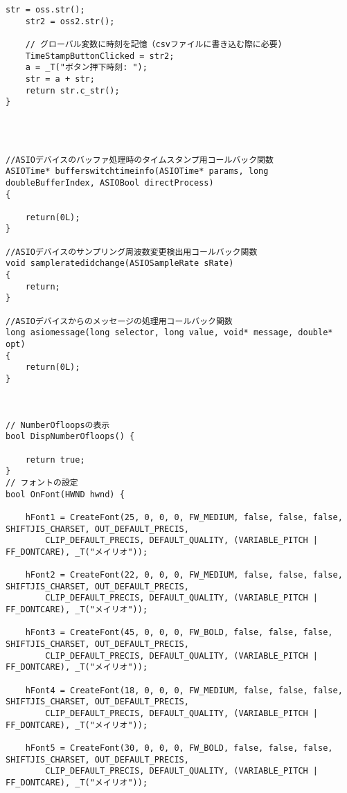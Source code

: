 \begin{lstlisting}[caption=main.cpp]
	str = oss.str();
	str2 = oss2.str();

	// グローバル変数に時刻を記憶（csvファイルに書き込む際に必要)
	TimeStampButtonClicked = str2;
	a = _T("ボタン押下時刻: ");
	str = a + str;
	return str.c_str();
}




//ASIOデバイスのバッファ処理時のタイムスタンプ用コールバック関数
ASIOTime* bufferswitchtimeinfo(ASIOTime* params, long doubleBufferIndex, ASIOBool directProcess)
{
	
	return(0L);
}

//ASIOデバイスのサンプリング周波数変更検出用コールバック関数
void sampleratedidchange(ASIOSampleRate sRate)
{
	return;
}

//ASIOデバイスからのメッセージの処理用コールバック関数
long asiomessage(long selector, long value, void* message, double* opt)
{
	return(0L);
}



// NumberOfloopsの表示
bool DispNumberOfloops() {

	return true;
}
// フォントの設定
bool OnFont(HWND hwnd) {

	hFont1 = CreateFont(25, 0, 0, 0, FW_MEDIUM, false, false, false, SHIFTJIS_CHARSET, OUT_DEFAULT_PRECIS,
		CLIP_DEFAULT_PRECIS, DEFAULT_QUALITY, (VARIABLE_PITCH | FF_DONTCARE), _T("メイリオ"));

	hFont2 = CreateFont(22, 0, 0, 0, FW_MEDIUM, false, false, false, SHIFTJIS_CHARSET, OUT_DEFAULT_PRECIS,
		CLIP_DEFAULT_PRECIS, DEFAULT_QUALITY, (VARIABLE_PITCH | FF_DONTCARE), _T("メイリオ"));

	hFont3 = CreateFont(45, 0, 0, 0, FW_BOLD, false, false, false, SHIFTJIS_CHARSET, OUT_DEFAULT_PRECIS,
		CLIP_DEFAULT_PRECIS, DEFAULT_QUALITY, (VARIABLE_PITCH | FF_DONTCARE), _T("メイリオ"));

	hFont4 = CreateFont(18, 0, 0, 0, FW_MEDIUM, false, false, false, SHIFTJIS_CHARSET, OUT_DEFAULT_PRECIS,
		CLIP_DEFAULT_PRECIS, DEFAULT_QUALITY, (VARIABLE_PITCH | FF_DONTCARE), _T("メイリオ"));

	hFont5 = CreateFont(30, 0, 0, 0, FW_BOLD, false, false, false, SHIFTJIS_CHARSET, OUT_DEFAULT_PRECIS,
		CLIP_DEFAULT_PRECIS, DEFAULT_QUALITY, (VARIABLE_PITCH | FF_DONTCARE), _T("メイリオ"));


\end{lstlisting}
